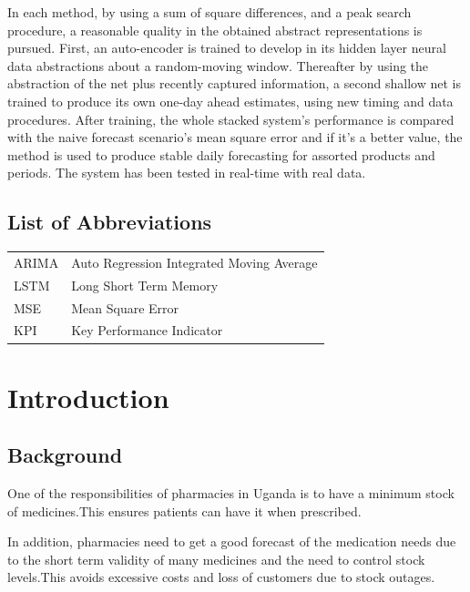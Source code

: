 \documentclass[12pt]{report}
\begin{document}
\indent In each method, by using a sum of square differences, and a peak search procedure, a reasonable quality in the obtained abstract representations is pursued. First, an auto-encoder is trained to develop in its hidden layer neural data abstractions about a random-moving window. Thereafter by using the abstraction of the net plus recently captured information, a second shallow net is trained to produce its own one-day ahead estimates, using new timing and data procedures. After training, the whole stacked system’s performance is compared with the naive forecast scenario’s mean square error and if it's a better value, the method is used to produce stable daily forecasting for assorted products and periods. The system has been tested in real-time with real data.

\newpage

\tableofcontents

\newpage

\listoffigures

\newpage

\listoftables

\newpage



\section*{List of Abbreviations}

\begin{tabular}{p{3cm} l}
	ARIMA	& Auto Regression Integrated Moving Average\\
	LSTM	& Long Short Term Memory\\	
  MSE & Mean Square Error\\
  KPI & Key Performance Indicator

\end{tabular}


\newpage

\chapter{Introduction}

\section{Background}
One of the responsibilities of pharmacies in  Uganda is to have a minimum stock of medicines.This ensures patients can have it when prescribed.

In addition, pharmacies need to get a good forecast of the medication needs due to the short term validity of many medicines and the need to control stock levels.This avoids excessive costs and loss of customers due to stock outages.\\
\end{document}
